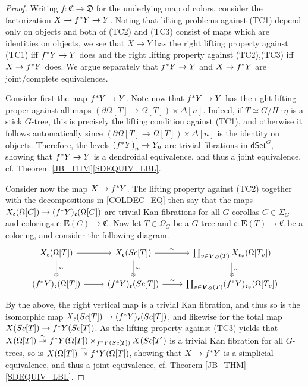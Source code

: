 \documentclass[a4paper,10pt
,draft
]{article}%
\numberwithin{equation}{section}
\numberwithin{figure}{section}
\theoremstyle{definition} %
\newcommand{\1}{\ensuremath{\mathbbm 1}}%
\begin{document}
\begin{proof}
Writing $f \colon \mathfrak{C} \to \mathfrak{D}$ for the underlying map of colors,
consider the factorization $X \to f^{\**}Y \to Y$.
%
Noting that lifting problems against (TC1) depend only on objects and both of (TC2) and (TC3) consist of maps which are identities on objects,
we see that $X \to Y$ has the right lifting property against (TC1) iff 
$f^{\**} Y \to Y$ does
and the right lifting property against 
(TC2),(TC3) iff $X \to f^{\**}Y$ does.
We argue separately that 
$f^{\**} Y \to Y$ and $X \to f^{\**}Y$
are joint/complete equivalences.

Consider first the map $f^{\**} Y \to Y$. Note now that $f^{\**} Y \to Y$ has the right lifting proper against all maps 
$\left(\partial \Omega[T] \to \Omega[T] \right) \times \Delta[n]$.
Indeed, if $T \simeq G/H \cdot \eta$ is a stick $G$-tree,
this is precisely the lifting condition against (TC1), and otherwise it follows automatically since $\left(\partial \Omega[T] \to \Omega[T] \right) \times \Delta[n]$ is the identity on objects.
Therefore, the levels 
$\left(f^{\**} Y \right)_n \to Y_n$ are trivial fibrations in 
$\mathsf{dSet}^G$, showing that 
$f^{\**} Y \to Y$ is a dendroidal equivalence, 
and thus a joint equivalence, 
cf. Theorem \ref{JB_THM}\ref{SDEQUIV_LBL}.

Consider now the map $X \to f^{\**} Y$.
The lifting property against (TC2) 
together with the decompositions in
\eqref{COLDEC_EQ} %
then say that the maps
$X_{\mathfrak{c}}(\Omega[C]) \to 
(f^{\**} Y)_{\mathfrak{c}} (\Omega[C])$
are trivial Kan fibrations for all $G$-corollas $C \in \Sigma_G$
and colorings $\mathfrak{c} \colon \boldsymbol{E}(C) \to \mathfrak{C}$.
Now let $T \in \Omega_G$ be a $G$-tree and 
$\mathfrak{c} \colon \boldsymbol{E}(T) \to \mathfrak{C}$
be a coloring,
and consider the following diagram.
\[
\begin{tikzcd}
X_{\mathfrak{c}}(\Omega[T]) \ar{r} \ar[->>]{d}{\sim}
&
X_{\mathfrak{c}}(Sc[T]) \ar{r}{\simeq} \ar[->>]{d}{\sim}
&
\prod_{v \in \boldsymbol{V}_G(T)} 
X_{\mathfrak{c}_v}(\Omega[T_v])
\ar[->>]{d}{\sim}
\\
(f^{\**} Y)_{\mathfrak{c}}(\Omega[T]) \ar{r}
&
(f^{\**} Y)_{\mathfrak{c}}(Sc[T]) \ar{r}{\simeq} 
&
\prod_{v \in \boldsymbol{V}_G(T)} 
(f^{\**} Y)_{\mathfrak{c}_v}
(\Omega[T_v]) 
\end{tikzcd}
\]
By the above, the right vertical map is a trivial Kan fibration,
and thus so is the isomorphic map
$X_{\mathfrak c}(Sc[T]) \to (f^{\**} Y)_{\mathfrak{c}} (Sc[T])$,
and likewise for the total map
$X(Sc[T]) \to f^{\**} Y (Sc[T])$.
As the lifting property against (TC3)
yields that
$
X(\Omega[T]) \overset{\sim}{\twoheadrightarrow}
f^{\**}Y(\Omega[T]) \times_{f^{\**}Y(Sc[T])} X(Sc[T]) 
$
is a trivial Kan fibration for all $G$-trees,
so is $X(\Omega[T]) 
\overset{\sim}{\twoheadrightarrow} f^{\**} Y (\Omega[T])$,
showing that $X \to f^{\**} Y$ is a simplicial equivalence, and thus a joint equivalence,
cf. Theorem \ref{JB_THM}\ref{SDEQUIV_LBL}.
\end{proof}
\end{document}
